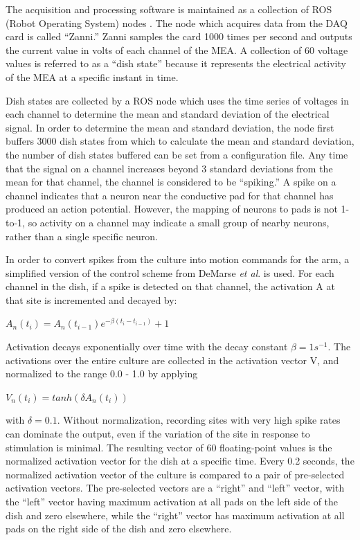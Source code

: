 \documentclass[letterpaper]{article}
\begin{document}
The acquisition and processing software is maintained as a collection of ROS (Robot Operating System) nodes \cite{ROSAnnouncementPaper}.
The node which acquires data from the DAQ card is called ``Zanni.''
Zanni samples the card 1000 times per second and outputs the current value in volts of each channel of the MEA. 
A collection of 60 voltage values is referred to as a ``dish state'' because it represents the electrical activity of the MEA at a specific instant in time. 

Dish states are collected by a ROS node which uses the time series of voltages in each channel to determine the mean and standard deviation of the electrical signal. 
In order to determine the mean and standard deviation, the node first buffers 3000 dish states from which to calculate the mean and standard deviation, the number of dish states buffered can be set from a configuration file. 
Any time that the signal on a channel increases beyond 3 standard deviations from the mean for that channel, the channel is considered to be ``spiking.'' 
A spike on a channel indicates that a neuron near the conductive pad for that channel has produced an action potential. 
However, the mapping of neurons to pads is not 1-to-1, so activity on a channel may indicate a small group of nearby neurons, rather than a single specific neuron.

In order to convert spikes from the culture into motion commands for the arm, a simplified version of the control scheme from DeMarse \textit{et al}.  is used. 
For each channel in the dish, if a spike is detected on that channel, the activation A at that site is incremented and decayed by: 

$A_n (t_i) = A_n(t_{i-1})e^{-\beta(t_i - t_{i-1})} + 1$

\noindent Activation decays exponentially over time with the decay constant $\beta=1s^{-1}$.
The activations over the entire culture are collected in the activation vector V, and normalized to the range 0.0 - 1.0 by applying

$V_n(t_i) = tanh(\delta A_n(t_i))$

\noindent with $\delta=0.1$. Without normalization, recording sites with very high spike rates can dominate the output, even if the variation of the site in response to stimulation is minimal. 
The resulting vector of 60 floating-point values is the normalized activation vector for the dish at a specific time.
Every 0.2 seconds, the normalized activation vector of the culture is compared to a pair of pre-selected activation vectors. 
The pre-selected vectors are a ``right'' and ``left'' vector, with the ``left'' vector having maximum activation at all pads on the left side of the dish and zero elsewhere, while the ``right'' vector has maximum activation at all pads on the right side of the dish and zero elsewhere. 
\end{document}
